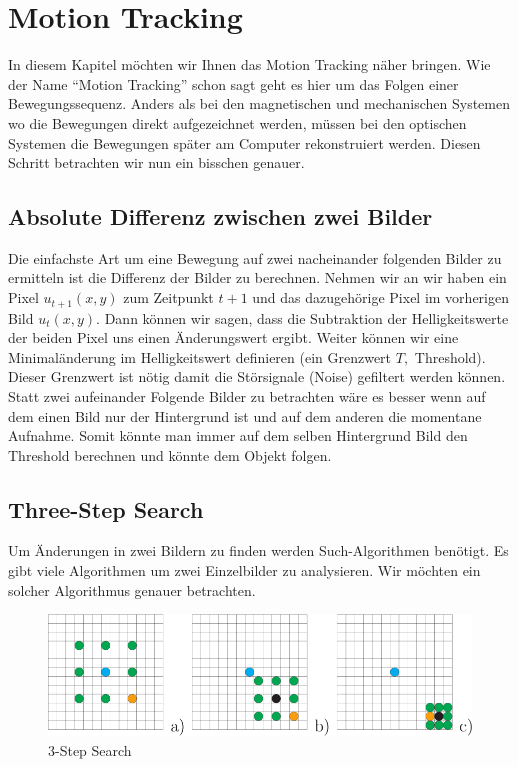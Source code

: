 \chapter{Motion Tracking}

In diesem Kapitel möchten wir Ihnen das Motion Tracking näher bringen. Wie der Name ``Motion Tracking'' schon sagt geht es hier um das Folgen einer Bewegungssequenz. Anders als bei den magnetischen und mechanischen Systemen wo die Bewegungen direkt aufgezeichnet werden, müssen bei den optischen Systemen die Bewegungen später am Computer rekonstruiert werden. Diesen Schritt betrachten wir nun ein bisschen genauer.

\section{Absolute Differenz zwischen zwei Bilder}
\label{sec:absolute_diff}
Die einfachste Art um eine Bewegung auf zwei nacheinander folgenden Bilder zu ermitteln ist die Differenz der Bilder zu berechnen. Nehmen wir an wir haben ein Pixel $ u_{t+1}(x,y) $ zum Zeitpunkt $ t+1 $ und das dazugehörige Pixel im vorherigen Bild $ u_{t}(x,y) $. Dann können wir sagen, dass die Subtraktion der Helligkeitswerte der beiden Pixel uns einen Änderungswert ergibt. Weiter können wir eine Minimaländerung im Helligkeitswert definieren (ein Grenzwert $T, $ Threshold). Dieser Grenzwert ist nötig damit die Störsignale (Noise) gefiltert werden können.\\
Statt zwei aufeinander Folgende Bilder zu betrachten wäre es besser wenn auf dem einen Bild nur der Hintergrund ist und auf dem anderen die momentane Aufnahme. Somit könnte man immer auf dem selben Hintergrund Bild den Threshold berechnen und könnte dem Objekt folgen. 

\section{Three-Step Search}
Um Änderungen in zwei Bildern zu finden werden Such-Algorithmen benötigt. Es gibt viele Algorithmen um zwei Einzelbilder zu analysieren. Wir möchten ein solcher Algorithmus genauer betrachten.

\begin{figure}[htbp]
\centering
\includegraphics[scale=0.5]{include/3step.png}
\caption{3-Step Search}
\end{figure}

